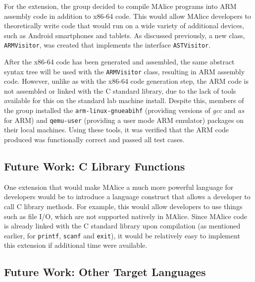 \documentclass[a4wide, 11pt]{article}
\begin{document}
For the extension, the group decided to compile MAlice programs into ARM
assembly code in addition to x86-64 code. This would allow MAlice developers
to theoretically write code that would run on a wide variety of additional
devices, such as Android smartphones and tablets. As discussed previously, 
a new class, \texttt{ARMVisitor}, was created that implements the interface
\texttt{ASTVisitor}.

After the x86-64 code has been generated and assembled, the same abstract syntax
tree will be used with the \texttt{ARMVisitor} class, resulting in ARM assembly
code. However, unlike as with the x86-64 code generation step, the ARM code is
not assembled or linked with the C standard library, due to the lack of tools
available for this on the standard lab machine install. Despite this, members
of the group installed the \texttt{arm-linux-gnueabihf} (providing versions of
\emph{gcc} and \emph{as} for ARM) and \texttt{qemu-user} (providing a user mode
ARM emulator) packages on their local machines. Using these tools, it was
verified that the ARM code produced was functionally correct and passed all
test cases.

\subsection{Future Work: C Library Functions}

One extension that would make MAlice a much more powerful language for 
developers would be to introduce a language construct that allows a developer 
to call C library methods. For example, this would allow developers to use 
things such as file I/O, which are not supported natively in MAlice. Since 
MAlice code is already linked with the C standard library upon compilation
(as mentioned earlier, for \texttt{printf}, \texttt{scanf} and \texttt{exit}),
it would be relatively easy to implement this extension if additional time
were available.

\subsection{Future Work: Other Target Languages}

\enddocument
\end{document}

